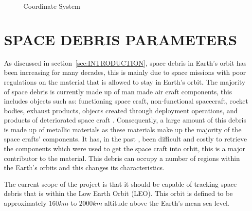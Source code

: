 \documentclass[11pt]{witseiepaper}
\begin{document}
\begin{bibunit}[witseie]
\begin{figure}
\caption{Coordinate System}
\label{fig:CoordinateSystem}
\end{figure}


\section{SPACE DEBRIS PARAMETERS} \label{sec:SpaceDebrisParameters}
As discussed in section~\ref{sec:INTRODUCTION}, space debris in Earth's orbit has been increasing for many decades, this is mainly due to space missions with poor regulations on the material that is allowed to stay in Earth's orbit.
The majority of space debris is currently made up of man made air craft components, this includes objects such as: functioning space craft, non-functional spacecraft, rocket bodies, exhaust products, objects created through deployment operations, and products of deteriorated space craft \cite{OrbitalDebrisTechnicalAssessment}.
Consequently, a large amount of this debris is made up of metallic materials as these materials make up the majority of the space crafts' components.
It has, in the past \cite{Spacex}, been difficult and costly to retrieve the components which were used to get the space craft into orbit, this is a major contributor to the material.
This debris can occupy a number of regions within the Earth's orbits and this changes its characteristics.

The current scope of the project is that it should be capable of tracking space debris that is within the Low Earth Orbit (LEO). This orbit is defined to be approximately $160 km$ to $2000 km$ altitude above the Earth's mean sea level.



\end{bibunit}
\end{document}
